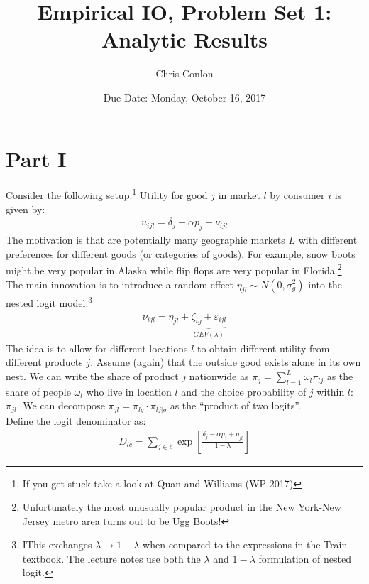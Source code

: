 \documentclass[12pt]{article}
\begin{document}
\title{Empirical IO, Problem Set 1: \\
Analytic Results}
\author{Chris Conlon}
\date{Due Date: Monday, October 16, 2017}
\maketitle

\section*{\normalsize Part I}
Consider the following setup.\footnote{If you get stuck take a look at Quan and Williams (WP 2017)} Utility for good $j$ in market $l$ by consumer $i$ is given by:
\begin{eqnarray*}
u_{ijl} = \delta_j - \alpha p_j + \nu_{ijl}
\end{eqnarray*}
The motivation is that are potentially many geographic markets $L$ with different preferences for different goods (or categories of goods). For example, snow boots might be very popular in Alaska while flip flops are very popular in Florida.\footnote{Unfortunately the most unusually popular product in the New York-New Jersey metro area turns out to be Ugg Boots!}\\

\noindent The main innovation is to introduce a random effect $\eta_{jl} \sim N(0,\sigma_g^2)$ into the nested logit model:\footnote{IThis exchanges $\lambda \rightarrow 1-\lambda$ when compared to the expressions in the Train textbook. The lecture notes use both the $\lambda$ and $1-\lambda$ formulation of nested logit.}
\begin{eqnarray*}
\nu_{ijl} = \eta_{jl}+ \underbrace{\zeta_{ig} + \varepsilon_{ijl}}_{GEV(\lambda)}
\end{eqnarray*}
The idea is to allow for different locations $l$ to obtain different utility from different products $j$. Assume (again) that the outside good exists alone in its own nest. We can write the share of product $j$ nationwide as $\pi_j = \sum_{l=1}^L \omega_l \pi_{lj}$ as the share of people $\omega_l$ who live in location $l$ and the choice probability of $j$ within $l$: $\pi_{jl}$. We can decompose $\pi_{jl} =  \pi_{lg} \cdot \pi_{lj|g}$ as the ``product of two logits''.\\

Define the logit denominator as:
\begin{eqnarray*}
D_{lc} = \sum_{j \in c} \exp \left[\frac{\delta_j  -\alpha p_j+ \eta_{jl}}{1-\lambda}\right]
\end{eqnarray*}
\end{document}
